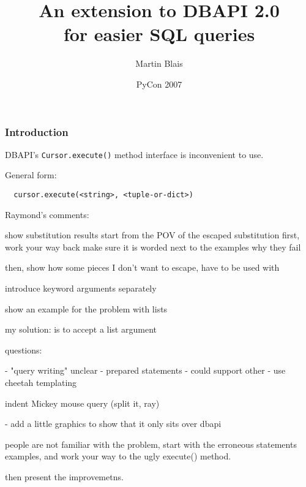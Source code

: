\documentclass{beamer}
\title{An extension to DBAPI 2.0 \\
for easier SQL queries}
\subtitle{}
\author{Martin Blais}
\institute{}
\date{PyCon 2007}
\begin{document}
\begin{frame}
  \titlepage
\end{frame}



\begin{frame}[fragile]
  \frametitle{Introduction}

  DBAPI's \texttt{Cursor.execute()} method interface is inconvenient to use.

\vfill

  General form:
\begin{verbatim}
  cursor.execute(<string>, <tuple-or-dict>)
\end{verbatim}

\vfill

\end{frame}



Raymond's comments:


  show substitution results
  start from the POV of the escaped substitution first, work your way back
  make sure it is worded next to the examples why they fail

  then, show how some pieces I don't want to escape, have to be used with %

  introduce keyword arguments separately

  show an example for the problem with lists

    my solution: is to accept a list argument


questions:

- "query writing" unclear
- prepared statements
- could support other %
- use cheetah templating

indent Mickey mouse query (split it, ray)

- add a little graphics to show that it only sits over dbapi

people are not familiar with the problem, start with the erroneous statements
examples, and work your way to the ugly execute() method.

then present the improvemetns.
\end{document}
